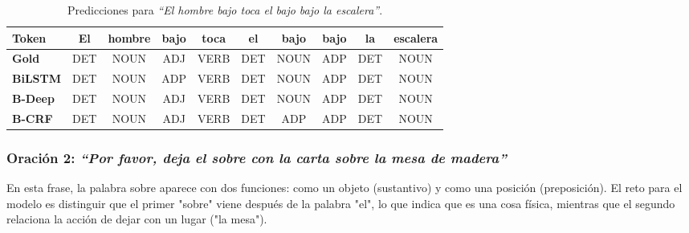 \documentclass[12pt, a4paper]{article}
\begin{document}
\begin{table}[H]
    \centering
    \caption{Predicciones para \textit{``El hombre bajo toca el bajo bajo la escalera''}.}
    \label{tab:inf1}
    \begin{tabular}{lccccccccc}
        \toprule
        \textbf{Token}   & El  & hombre & bajo & toca & el  & bajo & bajo & la  & escalera \\
        \midrule
        \textbf{Gold}    & DET & NOUN   & ADJ  & VERB & DET & NOUN & ADP  & DET & NOUN     \\
        \textbf{BiLSTM}  & DET & NOUN    & ADP  & VERB  & DET & NOUN  & ADP  & DET & NOUN      \\
        \textbf{B-Deep}  & DET & NOUN   & ADJ  & VERB & DET & NOUN & ADP & DET & NOUN     \\
        \textbf{B-CRF}   & DET & NOUN    & ADJ  & VERB  & DET & ADP  & ADP  & DET & NOUN      \\
        \bottomrule
    \end{tabular}
\end{table}

\subsubsection{Oración 2: \textit{``Por favor, deja el sobre con la carta sobre la mesa de madera''}}

En esta frase, la palabra sobre aparece con dos funciones: como un objeto (sustantivo) y como una posición (preposición). El reto para el modelo es distinguir que el primer "sobre" viene después de la palabra "el", lo que indica que es una cosa física, mientras que el segundo relaciona la acción de dejar con un lugar ("la mesa").
\end{document}
